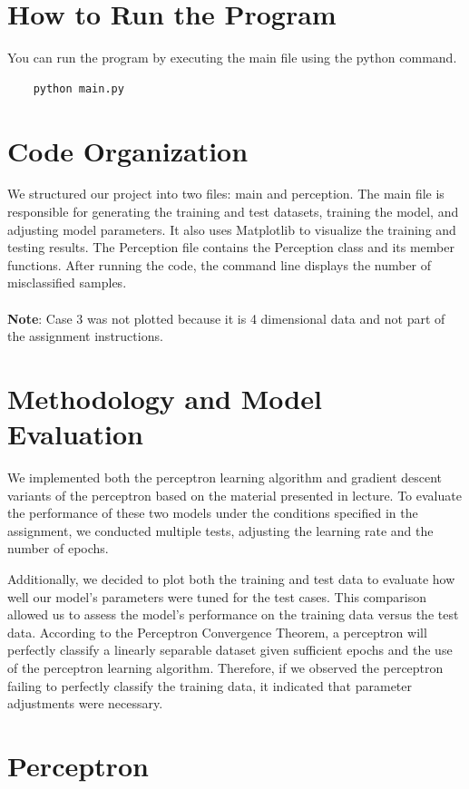 \documentclass{article}
\begin{document}
\newpage
\section{How to Run the Program}
You can run the program by executing the main file using the python command.
\begin{verbatim}
    python main.py
\end{verbatim}
\section{Code Organization}
We structured our project into two files: main and perception. The main file is responsible for generating the training and test datasets, training the model, and adjusting model parameters. It also uses Matplotlib to visualize the training and testing results. The Perception file contains the Perception class and its member functions. After running the code, the command line displays the number of misclassified samples. \\ \\
\textbf{Note}: Case 3 was not plotted because it is 4 dimensional data and not part of the assignment instructions. 

\section{Methodology and Model Evaluation}
We implemented both the perceptron learning algorithm and gradient descent variants of the perceptron based on the material presented in lecture. To evaluate the performance of these two models under the conditions specified in the assignment, we conducted multiple tests, adjusting the learning rate and the number of epochs.

Additionally, we decided to plot both the training and test data to evaluate how well our model's parameters were tuned for the test cases. This comparison allowed us to assess the model's performance on the training data versus the test data. According to the Perceptron Convergence Theorem, a perceptron will perfectly classify a linearly separable dataset given sufficient epochs and the use of the perceptron learning algorithm. Therefore, if we observed the perceptron failing to perfectly classify the training data, it indicated that parameter adjustments were necessary.

\section{Perceptron}
\end{document}
